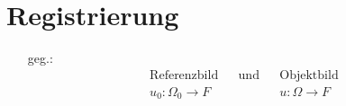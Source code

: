 \section{Registrierung}

\begin{enumerate}
    \item[geg.:] \begin{align*}
        \text{Referenzbild} & & \text{und} & &  \text{Objektbild}\\
        u_0: \Omega_0 \to F & & \ & & u:\Omega \to F
    \end{align*}
    \begin{center}
\end{center}
\end{enumerate}
